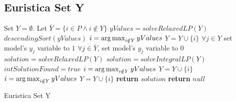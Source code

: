 \subsection{Euristica Set Y}
\begin{algorithm}
	\begin{algorithmic}[1]
		\State Set $ Y = \emptyset $. Let $ \bar{Y} = \{i \in P \land i \notin Y\}$ \label{set}
		\State $yValues = solveRelaxedLP(Y)$ \label{solver1}
		\State $descendingSort(yValues)$ \label{sort}
		\State $i = \operatorname*{arg\,max}_{i \notin Y} yValues $ \label{choose1} 
		\State $Y = Y \cup \{i\}$ \label{union1}
		 \label{while}
		\State $\forall j \in Y $ set model's $y_j$ variable to $1$ \label{setto1} 
		\State $\forall  j \in \bar{Y} $, set model's $y_j$ variable to $0$ \label{setto0}
		\State $solution = solveRelaxedLP(Y)$ \label{solver2}
		 \label{if1}
		\State $solution = solveIntegralLP(Y)$ \label{solvei}
		 \label{if2}
		\State $intSolutionFound = true$ \label{found}
		\Else \label{elsei}
		\State $i = \operatorname*{arg\,max}_{i \notin Y} yValues $  
		\State $Y = Y \cup \{i\}$ \label{addy1}
		\EndIf
		\Else \label{elser}
		\State $i = \operatorname*{arg\,max}_{i \notin Y} yValues $ 
		\State $Y = Y \cup \{i\}$ \label{addy2}	
		\EndIf
		\EndWhile
		 \label{ifsolved}
		\State \textbf{return} $solution$ \label{retsol}
		\Else
		\State \textbf{return} $null$
		\EndIf	
		
	\end{algorithmic}
	\caption{Euristica Set Y \label{alg:heuristic}}
\end{algorithm}

